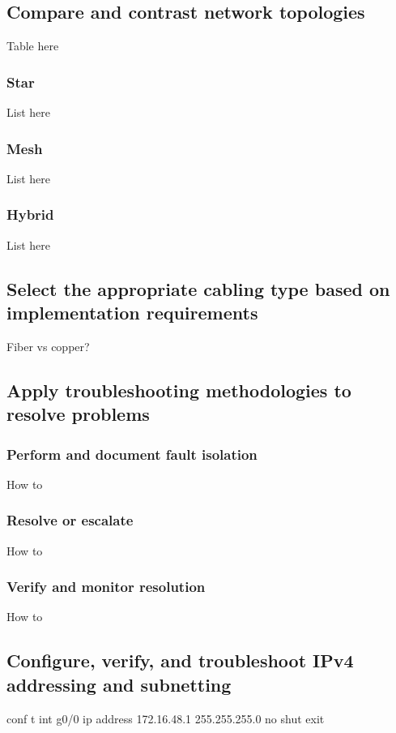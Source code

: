 \documentclass[10pt]{article}
\begin{document}
\subsection{Compare and contrast network topologies}
Table here
\subsubsection{Star}
List here
\subsubsection{Mesh}
List here
\subsubsection{Hybrid}
List here

\subsection{Select the appropriate cabling type based on implementation requirements}
Fiber vs copper?

\subsection{Apply troubleshooting methodologies to resolve problems}
\subsubsection{Perform and document fault isolation}
How to

\subsubsection{Resolve or escalate}
How to

\subsubsection{Verify and monitor resolution}
How to

\subsection{Configure, verify, and troubleshoot IPv4 addressing and subnetting}
\begin{cisco}[title=Set IP Address]
conf t
int g0/0
ip address 172.16.48.1 255.255.255.0
no shut
exit
\end{cisco}
\end{document}
